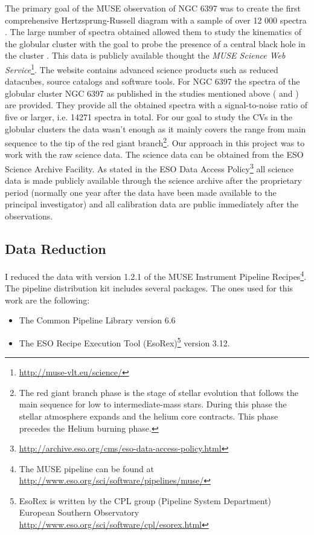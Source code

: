 The primary goal of the MUSE observation of NGC 6397 was to create the first comprehensive Hertzsprung-Russell diagram with a sample of over 12 000 spectra \citep{husser_muse_2016}. The large number of spectra obtained allowed them to study the kinematics of the globular cluster with the goal to probe the presence of a central black hole in the cluster \citep{kamann_muse_2016}. This data is publicly available thought the \emph{MUSE Science Web Service}\footnote{\url{http://muse-vlt.eu/science/}}. The website contains advanced science products such as reduced datacubes, source catalogs and software tools. For NGC 6397 the spectra of the globular cluster NGC 6397 as published in the studies mentioned above (\cite{husser_muse_2016} and \cite{kamann_muse_2016}) are provided. They provide all the obtained spectra with a signal-to-noise ratio of five or larger, i.e. 14271 spectra in total. For our goal to study the CVs in the globular clusters the data wasn't enough as it mainly covers the range from main sequence to the tip of the red giant branch\footnote{The red giant branch phase is the stage of stellar evolution that follows the main sequence for low to intermediate-mass stars. During this phase the stellar atmosphere expands and the helium core contracts. This phase precedes the Helium burning phase. }. Our approach in this project was to work with the raw science data. The science data can be obtained from the ESO  Science Archive Facility. As stated in the ESO Data Access Policy\footnote{\url{http://archive.eso.org/cms/eso-data-access-policy.html}} all science data is made publicly available through the science archive after the proprietary period (normally one year after the data have been made available to the principal investigator) and all calibration data are public immediately after the observations.  

\subsection{Data Reduction}

I reduced the data with version 1.2.1 of the MUSE Instrument Pipeline Recipes\footnote{The MUSE pipeline can be found at \url{http://www.eso.org/sci/software/pipelines/muse/}}\citep{weilbacher_design_2012}. The pipeline distribution kit includes several packages. The ones used for this work are the following:

\begin{itemize}
        \item The Common Pipeline Library version 6.6 \citep{mckay_common_2004}
        \item The ESO Recipe Execution Tool (EsoRex)\footnote{EsoRex is written by the CPL group (Pipeline System Department) European Southern Observatory \url{http://www.eso.org/sci/software/cpl/esorex.html}} version 3.12.
\end{itemize}


